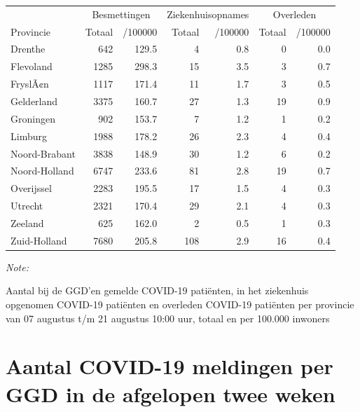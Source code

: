 \documentclass[
  english,
  man,floatsintext]{apa6}
\begin{document}
\begin{table}
\centering
\begin{threeparttable}
\begin{tabular}{lrrrrrr}
\toprule
\multicolumn{1}{c}{ } & \multicolumn{2}{c}{Besmettingen} & \multicolumn{2}{c}{Ziekenhuisopnames} & \multicolumn{2}{c}{Overleden} \\
\cmidrule(l{3pt}r{3pt}){2-3} \cmidrule(l{3pt}r{3pt}){4-5} \cmidrule(l{3pt}r{3pt}){6-7}
Provincie & Totaal & /100000 & Totaal & /100000 & Totaal & /100000\\
\midrule
Drenthe & 642 & 129.5 & 4 & 0.8 & 0 & 0.0\\
Flevoland & 1285 & 298.3 & 15 & 3.5 & 3 & 0.7\\
FryslÃ¢n & 1117 & 171.4 & 11 & 1.7 & 3 & 0.5\\
Gelderland & 3375 & 160.7 & 27 & 1.3 & 19 & 0.9\\
Groningen & 902 & 153.7 & 7 & 1.2 & 1 & 0.2\\
Limburg & 1988 & 178.2 & 26 & 2.3 & 4 & 0.4\\
Noord-Brabant & 3838 & 148.9 & 30 & 1.2 & 6 & 0.2\\
Noord-Holland & 6747 & 233.6 & 81 & 2.8 & 19 & 0.7\\
Overijssel & 2283 & 195.5 & 17 & 1.5 & 4 & 0.3\\
Utrecht & 2321 & 170.4 & 29 & 2.1 & 4 & 0.3\\
Zeeland & 625 & 162.0 & 2 & 0.5 & 1 & 0.3\\
Zuid-Holland & 7680 & 205.8 & 108 & 2.9 & 16 & 0.4\\
\bottomrule
\end{tabular}
\begin{tablenotes}
\item \textit{Note: } 
\item Aantal bij de GGD’en gemelde COVID-19 patiënten, in het ziekenhuis opgenomen COVID-19 patiënten en overleden COVID-19 patiënten per provincie van 07 augustus t/m 21 augustus 10:00 uur, totaal en per 100.000 inwoners
\end{tablenotes}
\end{threeparttable}
\end{table}

\newpage

\hypertarget{aantal-covid-19-meldingen-per-ggd-in-de-afgelopen-twee-weken}{%
\section{Aantal COVID-19 meldingen per GGD in de afgelopen twee weken}\label{aantal-covid-19-meldingen-per-ggd-in-de-afgelopen-twee-weken}}
\end{document}
